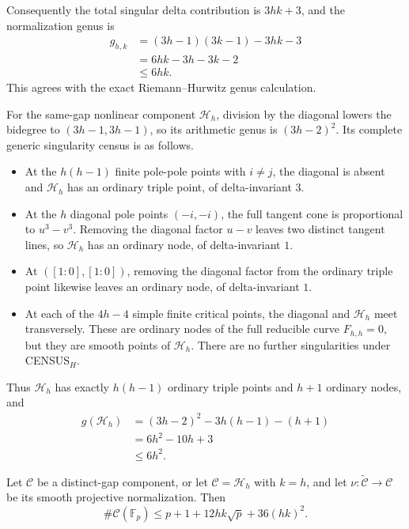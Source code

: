 Consequently the total singular delta contribution is $3hk+3$, and the
normalization genus is
\[
\begin{aligned}
 g_{h,k}
 &=(3h-1)(3k-1)-3hk-3\\
 &=6hk-3h-3k-2\\
 &\le6hk.
\end{aligned}
\]
This agrees with the exact Riemann--Hurwitz genus calculation.

For the same-gap nonlinear component $\mathcal H_h$, division by the
diagonal lowers the bidegree to $(3h-1,3h-1)$, so its arithmetic genus
is $(3h-2)^2$.  Its complete generic singularity census is as follows.
\begin{itemize}
\item At the $h(h-1)$ finite pole-pole points with $i\ne j$, the
diagonal is absent and $\mathcal H_h$ has an ordinary triple point, of
delta-invariant $3$.
\item At the $h$ diagonal pole points $(-i,-i)$, the full tangent cone
is proportional to $u^3-v^3$.  Removing the diagonal factor $u-v$
leaves two distinct tangent lines, so $\mathcal H_h$ has an ordinary
node, of delta-invariant $1$.
\item At $([1:0],[1:0])$, removing the diagonal factor from the
ordinary triple point likewise leaves an ordinary node, of
delta-invariant $1$.
\item At each of the $4h-4$ simple finite critical points, the
diagonal and $\mathcal H_h$ meet transversely.  These are ordinary
nodes of the full reducible curve $F_{h,h}=0$, but they are smooth
points of $\mathcal H_h$.  There are no further singularities under
CENSUS$_H$.
\end{itemize}
Thus $\mathcal H_h$ has exactly $h(h-1)$ ordinary triple points and
$h+1$ ordinary nodes, and
\[
\begin{aligned}
 g(\mathcal H_h)
 &=(3h-2)^2-3h(h-1)-(h+1)\\
 &=6h^2-10h+3\\
 &\le6h^2.
\end{aligned}
\]

\begin{lemma}
\label{lem:p16-pointcount}
Let $\mathcal C$ be a distinct-gap component, or let
$\mathcal C=\mathcal H_h$ with $k=h$, and let
$\nu:\widetilde{\mathcal C}\to\mathcal C$ be its smooth projective
normalization.  Then
\[
 \#\mathcal C(\mathbb F_p)
 \le p+1+12hk\sqrt p+36(hk)^2 .
\]
\end{lemma}

